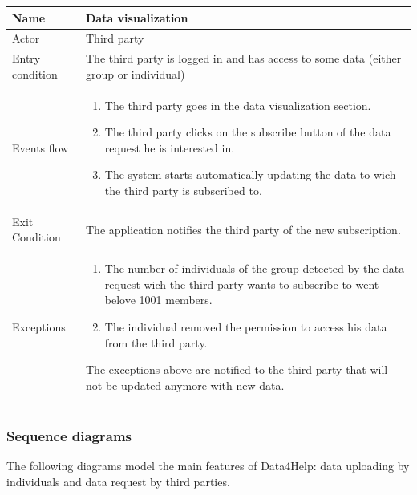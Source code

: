    
\begin{tabular}{|l|p{11cm}|}
    \hline
    Name & Data visualization
    \\ \hline
    Actor & Third party
    \\ \hline 
    Entry condition & The third party is logged in and has access to some data (either group or individual)
        \\ \hline
    Events flow &
    \begin{enumerate}
    \item The third party goes in the data visualization section.
	\item The third party clicks on the subscribe button of the data request he is interested in.
	\item The system starts automatically updating the data to wich the third party is subscribed to.
    \end{enumerate}
     \\ \hline
     Exit Condition & The application notifies the third party of the new subscription.
     \\
    \hline
    Exceptions &
        \begin{enumerate}
    \item The number of individuals of the group detected by the data request wich the third party wants to subscribe to went belove 1001 members.
    \item The individual removed the permission to access his data from the third party.
\end{enumerate}  
 The exceptions above are notified to the third party that will not be updated anymore with new data.
  \\
    \hline
\end{tabular}







\subsubsection{Sequence diagrams}
The following diagrams model the main features of Data4Help: data uploading by individuals and data request by third parties.


